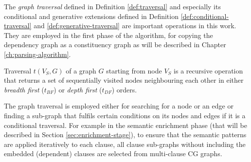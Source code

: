     

    The \textit{graph traversal} defined in Definition \ref{def:traversal} and especially its conditional and generative extensions defined in Definition \ref{def:conditional-traversal} and \ref{def:generative-traversal} are  important operations in this work. They are employed in the first phase of the algorithm, for copying the dependency graph as a constituency graph as will be described in Chapter \ref{ch:parsing-algorithm}.

    \begin{definition}[Traversal]\label{def:traversal}
        Traversal $t(V_S,G)$ of a graph $G$ starting from node $V_S$ is a recursive operation that returns a set of sequentially visited nodes neighbouring each other in either \textit{breadth first} ($t_{BF}$) or \textit{depth first} ($t_{DF}$) orders.
    \end{definition}

    The graph traversal is employed either for searching for a node or an edge or finding a sub-graph that fulfils certain conditions on its nodes and edges if it is a conditional traversal. For example in the semantic enrichment phase (that will be described in Section \ref{sec:enrichment-stage}), to ensure that the semantic patterns are applied iteratively to each clause, all clause sub-graphs without including the embedded (dependent) clauses are selected from multi-clause CG graphs. 

